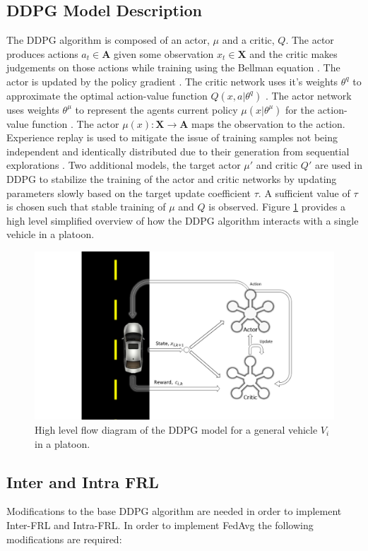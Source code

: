\subsection{DDPG Model Description}
The DDPG algorithm is composed of an actor, $\mu$ and a critic, $Q$. The actor produces 
actions $a_t \in \mathbf{A}$ given some observation $x_t \in \mathbf{X}$ and the critic 
makes judgements on those actions while training using the Bellman equation 
\cite{Lillicrap2016, sutton2018reinforcement}. The actor is updated by the policy gradient 
\cite{Lillicrap2016}.  The critic network uses it's weights $\theta^q$ to approximate the 
optimal action-value function $Q(x, a|\theta^q)$ \cite{Lillicrap2016}.  The actor network 
uses weights $\theta^\mu$ to represent the agents current policy $\mu(x|\theta^\mu)$ for 
the action-value function \cite{Lillicrap2016}.  The actor 
$\mu(x): \mathbf{X} \xrightarrow{} \mathbf{A}$ maps the observation to the action.  
Experience replay is used to mitigate the issue of training samples not being independent 
and identically distributed due to their generation from sequential explorations 
\cite{Lillicrap2016}.  Two additional models, the target actor $\mu'$ and critic $Q'$ 
are used in DDPG to stabilize the training of the actor and critic networks by updating 
parameters slowly based on the target update coefficient $\tau$.  A sufficient value of 
$\tau$ is chosen such that stable training of $\mu$ and $Q$ is observed.  
Figure \ref{fig:ddpgdraw} provides a high level simplified overview of how the DDPG 
algorithm interacts with a single vehicle in a platoon.  

\begin{figure}[H]
    \centering
    \includegraphics[width=0.6\linewidth]{assets/ddpg.PNG}
    \caption{High level flow diagram of the DDPG model for a general vehicle $V_i$ in a platoon.}
    \label{fig:ddpgdraw}
\end{figure}

\subsection{Inter and Intra FRL}
Modifications to the base DDPG algorithm are needed in order to implement Inter-FRL and 
Intra-FRL.  In order to implement FedAvg the following modifications are required:

